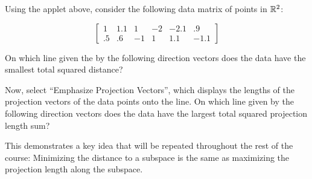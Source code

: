 \documentclass{ximera}
\begin{document}
\begin{problem}
  Using the applet above, consider the following data matrix of points in $\mathbb{R}^2$:

  $$\begin{bmatrix} 1 & 1.1 & 1 & -2 & -2.1 & .9\\ 
    .5 & .6 & -1 & 1 & 1.1 & -1.1\end{bmatrix}$$

  On which line given the by the following direction vectors does the data have the smallest total squared distance?

  \begin{multipleChoice}

  \end{multipleChoice}

  Now, select ``Emphasize Projection Vectors'', which displays the lengths of the projection vectors of the data points onto the line. On which line given by the following direction vectors does the data have the largest total squared projection length sum?

  \begin{multipleChoice}
  \end{multipleChoice}

  This demonstrates a key idea that will be repeated throughout the rest of the course: Minimizing the distance to a subspace is the same as maximizing the projection length along the subspace.
\end{problem}
\end{document}
